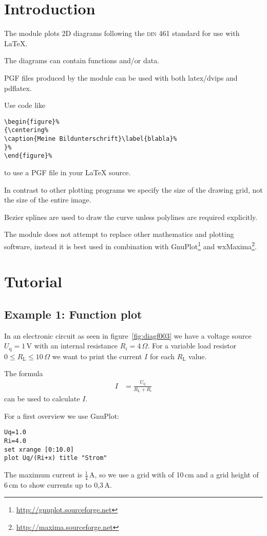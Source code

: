 \documentclass[origlongtable]{scrartcl}
\author{Dipl.-Ing.~D.~Krause}
\title{\resizebox{10cm}{!}{LaTeX::PGF::Diagram2D}}
\begin{document}
\startofdocument
\section{Introduction}
The module plots 2D diagrams following the \textsc{din} 461 standard
for use with \LaTeX{}.

The diagrams can contain functions and/or data.

PGF files produced by the module can be used with both latex/dvips
and pdflatex.

Use code like
\begin{lstlisting}
\begin{figure}%
{\centering%
\caption{Meine Bildunterschrift}\label{blabla}%
}%
\end{figure}%
\end{lstlisting}
to use a PGF file in your \LaTeX{} source.

In contrast to other plotting programs we specify the size of the
drawing grid, not the size of the entire image.

Bezier splines are used to draw the curve unless polylines are
required explicitly.

The module does not attempt to replace other mathematics and
plotting software, instead it is best used in combination
with
GnuPlot\footnote{\url{http://gnuplot.sourceforge.net}}
and
wxMaxima\footnote{\url{http://maxima.sourceforge.net}}.

\clearpage
\section{Tutorial}
\subsection[Function]{Example 1: Function plot}

In an electronic circuit as seen in figure~\vref{fig:diagf003}
we have a voltage source \(U_{\text{q}}=1\,\text{V}\) with an internal resistance
\(R_{i}=4\,\Omega\). For a variable load resistor
\(0\leq R_{\text{L}}\leq 10\,\Omega\) we want to print the current
\(I\) for each \(R_{\text{L}}\) value.

The formula
\begin{align*}I&=\frac{U_{\text{q}}}{R_{\text{L}}+R_{\text{i}}}\end{align*}
can be used to calculate \(I\).

For a first overview we use GnuPlot:
\begin{lstlisting}[language=GnuPlot]
Uq=1.0
Ri=4.0
set xrange [0:10.0]
plot Uq/(Ri+x) title "Strom"
\end{lstlisting}
The maximum current is \(\tfrac{1}{4}\,\text{A}\), so we use a grid with
of 10\,cm and a grid height of 6\,cm to show currents up to 0,3\,A.
\end{document}
